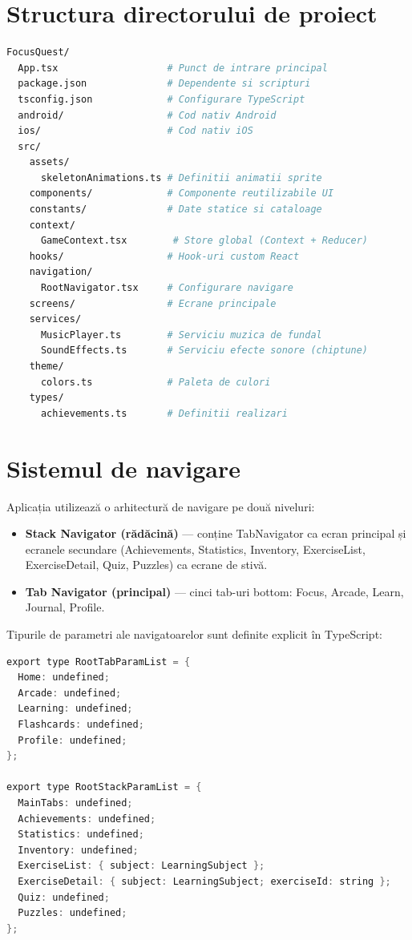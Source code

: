 \documentclass[12pt, a4paper, twoside]{report}
\numberwithin{equation}{section}
\begin{document}
\section{Structura directorului de proiect}

\begin{lstlisting}[language=bash, caption={Structura principală a proiectului}]
FocusQuest/
  App.tsx                   # Punct de intrare principal
  package.json              # Dependente si scripturi
  tsconfig.json             # Configurare TypeScript
  android/                  # Cod nativ Android
  ios/                      # Cod nativ iOS
  src/
    assets/
      skeletonAnimations.ts # Definitii animatii sprite
    components/             # Componente reutilizabile UI
    constants/              # Date statice si cataloage
    context/
      GameContext.tsx        # Store global (Context + Reducer)
    hooks/                  # Hook-uri custom React
    navigation/
      RootNavigator.tsx     # Configurare navigare
    screens/                # Ecrane principale
    services/
      MusicPlayer.ts        # Serviciu muzica de fundal
      SoundEffects.ts       # Serviciu efecte sonore (chiptune)
    theme/
      colors.ts             # Paleta de culori
    types/
      achievements.ts       # Definitii realizari
\end{lstlisting}

\section{Sistemul de navigare}

Aplicația utilizează o arhitectură de navigare pe două niveluri:

\begin{itemize}
  \item \textbf{Stack Navigator (rădăcină)} — conține TabNavigator ca ecran principal
    și ecranele secundare (Achievements, Statistics, Inventory, ExerciseList, ExerciseDetail,
    Quiz, Puzzles) ca ecrane de stivă.
  \item \textbf{Tab Navigator (principal)} — cinci tab-uri bottom: Focus, Arcade, Learn,
    Journal, Profile.
\end{itemize}

Tipurile de parametri ale navigatoarelor sunt definite explicit în TypeScript:

\begin{lstlisting}[language=Java, caption={Tipuri parametri navigatoare}]
export type RootTabParamList = {
  Home: undefined;
  Arcade: undefined;
  Learning: undefined;
  Flashcards: undefined;
  Profile: undefined;
};

export type RootStackParamList = {
  MainTabs: undefined;
  Achievements: undefined;
  Statistics: undefined;
  Inventory: undefined;
  ExerciseList: { subject: LearningSubject };
  ExerciseDetail: { subject: LearningSubject; exerciseId: string };
  Quiz: undefined;
  Puzzles: undefined;
};
\end{lstlisting}
\end{document}
